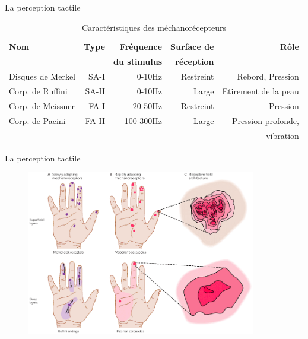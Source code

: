 \begin{frame}{La perception tactile}
\begin{table}[]
\centering
\footnotesize
	\begin{tabular}[]{lrrrr}
		\toprule
		\textbf{Nom}			& \textbf{Type}	
		                    & \textbf{Fréquence} & \textbf{Surface de} 
		                    & \textbf{Rôle} \\
		                    & & \textbf{du stimulus} & \textbf{réception} &\\
		\midrule
		Disques de Merkel				& SA-I	& 0-10Hz	& Restreint & Rebord, Pression		\\[0.25em]
		Corp. de Ruffini				& SA-II	& 0-10Hz	& Large & Etirement de la peau	\\[0.25em]
		Corp. de Meissner					& FA-I	& 20-50Hz	& Restreint & Pression	\\[0.25em]
		Corp. de Pacini				& FA-II	& 100-300Hz	& Large & Pression profonde,\\
		& & & & vibration\\
		\bottomrule
	\end{tabular}
	\caption{Caractéristiques des méchanorécepteurs}
\end{table}
\end{frame}

{
\begin{frame}{La perception tactile}
\begin{figure}
\centering
\includegraphics[width=10cm]{images/mechanoreceptors}
\end{figure}
\end{frame}
}

